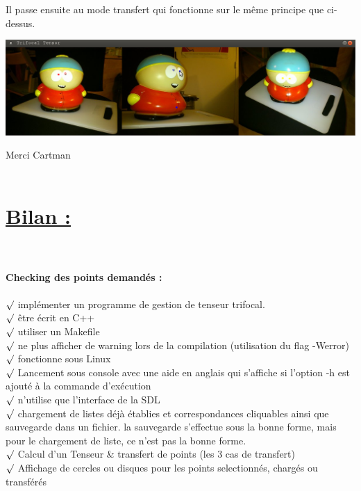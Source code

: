 \documentclass[a4paper,11pt,fleqn]{report}
\begin{document}
	Il passe ensuite au mode transfert qui fonctionne sur le m\^eme principe que ci-dessus.
	\begin{center}\includegraphics[scale=0.50]{./cartman2.png}\end{center}Merci Cartman\\\\
	\section{\underline{Bilan :}}
	\\\\
	\textbf{Checking des points demand\'es :}\\\\
	$\surd$ impl\'ementer un programme de gestion de tenseur trifocal.\\
	$\surd$ \^etre \'ecrit en C++\\
	$\surd$ utiliser un Makefile\\
	$\surd$ ne plus afficher de warning lors de la compilation (utilisation du flag -Werror)\\
	$\surd$ fonctionne sous Linux\\
	$\surd$ Lancement sous console avec une aide en anglais qui s'affiche si l'option -h est ajout\'e \`a la commande d'ex\'ecution\\
	$\surd$ n'utilise que l'interface de la SDL\\
	$\surd$ chargement de listes d\'ej\`a \'etablies et correspondances cliquables ainsi que sauvegarde dans un fichier. la sauvegarde s'effectue sous la bonne forme, mais pour le chargement de liste, ce n'est pas la bonne forme.\\
	$\surd$ Calcul d'un Tenseur & transfert de points (les 3 cas de transfert)\\
	$\surd$ Affichage de cercles ou disques pour les points selectionn\'es, charg\'es ou transf\'er\'es\\
		
\end{document}
